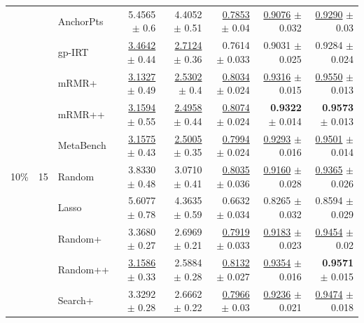 \begin{longtable}{llp{}rrrrr}
 &  & AnchorPts & 5.4565 {\scriptsize $\pm$ 0.6} & 4.4052 {\scriptsize $\pm$ 0.51} & \underline{0.7853} {\scriptsize $\pm$ 0.04} & \underline{0.9076} {\scriptsize $\pm$ 0.032} & \underline{0.9290} {\scriptsize $\pm$ 0.03} \\
 &  & gp-IRT & \underline{3.4642} {\scriptsize $\pm$ 0.44} & \underline{2.7124} {\scriptsize $\pm$ 0.36} & 0.7614 {\scriptsize $\pm$ 0.033} & 0.9031 {\scriptsize $\pm$ 0.025} & 0.9284 {\scriptsize $\pm$ 0.024} \\
 &  & mRMR+ & \underline{3.1327} {\scriptsize $\pm$ 0.49} & \underline{2.5302} {\scriptsize $\pm$ 0.4} & \underline{0.8034} {\scriptsize $\pm$ 0.024} & \underline{0.9316} {\scriptsize $\pm$ 0.015} & \underline{0.9550} {\scriptsize $\pm$ 0.013} \\
 &  & mRMR++ & \underline{3.1594} {\scriptsize $\pm$ 0.55} & \underline{2.4958} {\scriptsize $\pm$ 0.44} & \underline{0.8074} {\scriptsize $\pm$ 0.024} & \textbf{0.9322} {\scriptsize $\pm$ 0.014} & \textbf{0.9573} {\scriptsize $\pm$ 0.013} \\
 &  & MetaBench & \underline{3.1575} {\scriptsize $\pm$ 0.43} & \underline{2.5005} {\scriptsize $\pm$ 0.35} & \underline{0.7994} {\scriptsize $\pm$ 0.024} & \underline{0.9293} {\scriptsize $\pm$ 0.016} & \underline{0.9501} {\scriptsize $\pm$ 0.014} \\
\midrule
10\% & 15 & Random & 3.8330 {\scriptsize $\pm$ 0.48} & 3.0710 {\scriptsize $\pm$ 0.41} & \underline{0.8035} {\scriptsize $\pm$ 0.036} & \underline{0.9160} {\scriptsize $\pm$ 0.028} & \underline{0.9365} {\scriptsize $\pm$ 0.026} \\
 &  & Lasso & 5.6077 {\scriptsize $\pm$ 0.78} & 4.3635 {\scriptsize $\pm$ 0.59} & 0.6632 {\scriptsize $\pm$ 0.034} & 0.8265 {\scriptsize $\pm$ 0.032} & 0.8594 {\scriptsize $\pm$ 0.029} \\
 &  & Random+ & 3.3680 {\scriptsize $\pm$ 0.27} & 2.6969 {\scriptsize $\pm$ 0.21} & \underline{0.7919} {\scriptsize $\pm$ 0.033} & \underline{0.9183} {\scriptsize $\pm$ 0.023} & \underline{0.9454} {\scriptsize $\pm$ 0.02} \\
 &  & Random++ & \underline{3.1586} {\scriptsize $\pm$ 0.33} & 2.5884 {\scriptsize $\pm$ 0.28} & \underline{0.8132} {\scriptsize $\pm$ 0.027} & \underline{0.9354} {\scriptsize $\pm$ 0.016} & \textbf{0.9571} {\scriptsize $\pm$ 0.015} \\
 &  & Search+ & 3.3292 {\scriptsize $\pm$ 0.28} & 2.6662 {\scriptsize $\pm$ 0.22} & \underline{0.7966} {\scriptsize $\pm$ 0.03} & \underline{0.9236} {\scriptsize $\pm$ 0.021} & \underline{0.9474} {\scriptsize $\pm$ 0.018} \\

\end{longtable}
